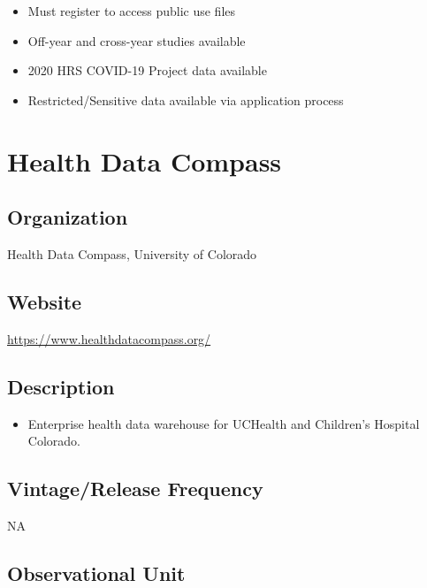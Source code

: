 \documentclass[
]{book}
\providecommand{\tightlist}{%
  \setlength{\itemsep}{0pt}\setlength{\parskip}{0pt}}
\begin{document}
\begin{itemize}
\tightlist
\item
  Must register to access public use files
\item
  Off-year and cross-year studies available
\item
  2020 HRS COVID-19 Project data available
\item
  Restricted/Sensitive data available via application process
\end{itemize}

\mainmatter

\hypertarget{health-data-compass}{%
\chapter{Health Data Compass}\label{health-data-compass}}

\hypertarget{organization-30}{%
\section{Organization}\label{organization-30}}

Health Data Compass, University of Colorado

\hypertarget{website-30}{%
\section{Website}\label{website-30}}

\url{https://www.healthdatacompass.org/}

\hypertarget{description-30}{%
\section{Description}\label{description-30}}

\begin{itemize}
\tightlist
\item
  Enterprise health data warehouse for UCHealth and Children's Hospital Colorado.
\end{itemize}

\hypertarget{vintagerelease-frequency-30}{%
\section{Vintage/Release Frequency}\label{vintagerelease-frequency-30}}

NA

\hypertarget{observational-unit-30}{%
\section{Observational Unit}\label{observational-unit-30}}
\end{document}
